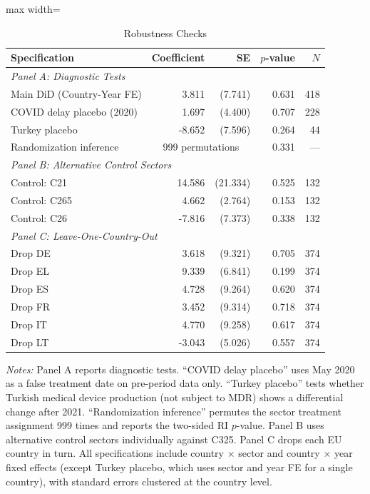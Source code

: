 \begin{table}[htbp]
\centering
\caption{Robustness Checks}
\label{tab:robustness}
\begin{adjustbox}{max width=\textwidth}
\begin{tabular}{lrrrr}
\toprule
Specification & Coefficient & SE & $p$-value & $N$ \\
\midrule
\multicolumn{5}{l}{\textit{Panel A: Diagnostic Tests}} \\
Main DiD (Country-Year FE) & 3.811 & (7.741) & 0.631 & 418 \\
COVID delay placebo (2020) & 1.697 & (4.400) & 0.707 & 228 \\
Turkey placebo & -8.652 & (7.596) & 0.264 & 44 \\
Randomization inference & \multicolumn{2}{c}{999 permutations} & 0.331 & --- \\
\midrule
\multicolumn{5}{l}{\textit{Panel B: Alternative Control Sectors}} \\
Control: C21 & 14.586 & (21.334) & 0.525 & 132 \\
Control: C265 & 4.662 & (2.764) & 0.153 & 132 \\
Control: C26 & -7.816 & (7.373) & 0.338 & 132 \\
\midrule
\multicolumn{5}{l}{\textit{Panel C: Leave-One-Country-Out}} \\
Drop DE & 3.618 & (9.321) & 0.705 & 374 \\
Drop EL & 9.339 & (6.841) & 0.199 & 374 \\
Drop ES & 4.728 & (9.264) & 0.620 & 374 \\
Drop FR & 3.452 & (9.314) & 0.718 & 374 \\
Drop IT & 4.770 & (9.258) & 0.617 & 374 \\
Drop LT & -3.043 & (5.026) & 0.557 & 374 \\
\bottomrule
\end{tabular}
\end{adjustbox}
\parbox{\textwidth}{\footnotesize \textit{Notes:} Panel A reports diagnostic tests. ``COVID delay placebo'' uses May 2020 as a false treatment date on pre-period data only. ``Turkey placebo'' tests whether Turkish medical device production (not subject to MDR) shows a differential change after 2021. ``Randomization inference'' permutes the sector treatment assignment 999 times and reports the two-sided RI $p$-value. Panel B uses alternative control sectors individually against C325. Panel C drops each EU country in turn. All specifications include country $\times$ sector and country $\times$ year fixed effects (except Turkey placebo, which uses sector and year FE for a single country), with standard errors clustered at the country level.}
\end{table}
